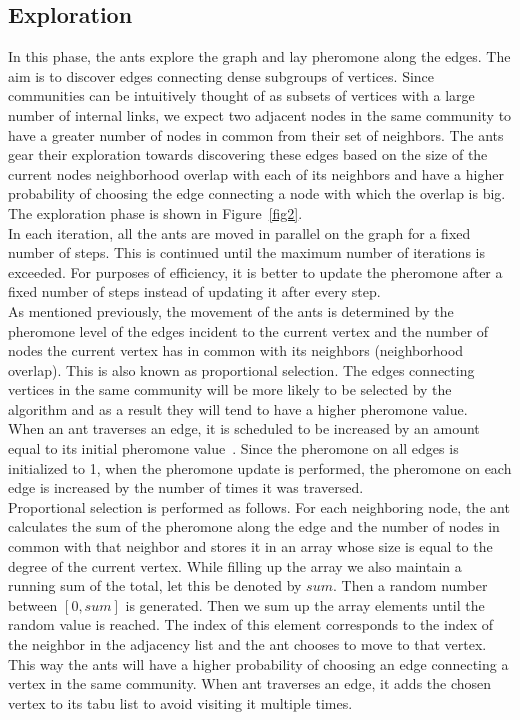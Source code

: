 \begin{spacing}{1.5}
\section{Exploration}

In this phase, the ants explore the graph and lay pheromone along the edges. The aim is to discover edges connecting dense subgroups of vertices. Since communities can be intuitively thought of as subsets of vertices with a large number of internal links, we expect two adjacent nodes in the same community to have a greater number of nodes in common from their set of neighbors. The ants gear their exploration towards discovering these edges based on the size of the current nodes neighborhood overlap with each of its neighbors and have a higher probability of choosing the edge connecting a node with which the overlap is big. The exploration phase is shown in Figure~\ref{fig2}.\\

\indent In each iteration, all the ants are moved in parallel on the graph for a fixed number of steps. This is continued until the maximum number of iterations is exceeded. For purposes of efficiency, it is better to update the pheromone after a fixed number of steps instead of updating it after every step.\\
\indent As mentioned previously, the movement of the ants is determined by the pheromone level of the edges incident to the current vertex and the number of nodes the current vertex has in common with its neighbors (neighborhood overlap). This is also known as proportional selection. The edges connecting vertices in the same community will be more likely to be selected by the algorithm and as a result they will tend to have a higher pheromone value. \\
\indent When an ant traverses an edge, it is scheduled to be increased by an amount equal to its initial pheromone value~\cite{5910378}. Since the pheromone on all edges is initialized to 1, when the pheromone update is performed, the pheromone on each edge is increased by the number of times it was traversed.\\
\indent Proportional selection is performed as follows. For each neighboring node, the ant calculates the sum of the pheromone along the edge and the number of nodes in common with that neighbor and stores it in an array whose size is equal to the degree of the current vertex. While filling up the array we also maintain a running sum of the total, let this be denoted by $sum$. Then a random number between $[0, sum]$ is generated. Then we sum up the array elements until the random value is reached. The index of this element corresponds to the index of the neighbor in the adjacency list and the ant chooses to move to that vertex. This way the ants will have a higher probability of choosing an edge connecting a vertex in the same community. When ant traverses an edge, it adds the chosen vertex to its tabu list to avoid visiting it multiple times.\\

\end{spacing}
